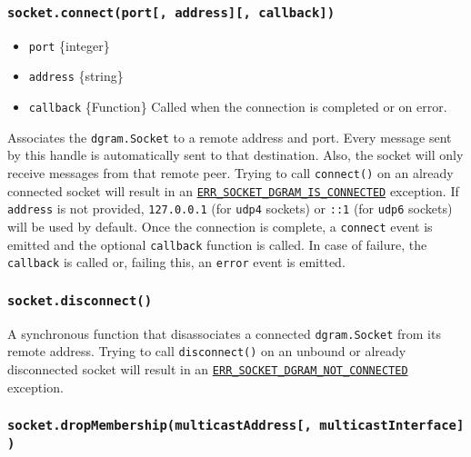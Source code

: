 \subsubsection{\texorpdfstring{\texttt{socket.connect(port{[},\ address{]}{[},\ callback{]})}}{socket.connect(port{[}, address{]}{[}, callback{]})}}\label{socket.connectport-address-callback}

\begin{itemize}
\tightlist
\item
  \texttt{port} \{integer\}
\item
  \texttt{address} \{string\}
\item
  \texttt{callback} \{Function\} Called when the connection is completed
  or on error.
\end{itemize}

Associates the \texttt{dgram.Socket} to a remote address and port. Every
message sent by this handle is automatically sent to that destination.
Also, the socket will only receive messages from that remote peer.
Trying to call \texttt{connect()} on an already connected socket will
result in an
\href{errors.md\#err_socket_dgram_is_connected}{\texttt{ERR\_SOCKET\_DGRAM\_IS\_CONNECTED}}
exception. If \texttt{address} is not provided,
\texttt{\textquotesingle{}127.0.0.1\textquotesingle{}} (for
\texttt{udp4} sockets) or
\texttt{\textquotesingle{}::1\textquotesingle{}} (for \texttt{udp6}
sockets) will be used by default. Once the connection is complete, a
\texttt{\textquotesingle{}connect\textquotesingle{}} event is emitted
and the optional \texttt{callback} function is called. In case of
failure, the \texttt{callback} is called or, failing this, an
\texttt{\textquotesingle{}error\textquotesingle{}} event is emitted.

\subsubsection{\texorpdfstring{\texttt{socket.disconnect()}}{socket.disconnect()}}\label{socket.disconnect}

A synchronous function that disassociates a connected
\texttt{dgram.Socket} from its remote address. Trying to call
\texttt{disconnect()} on an unbound or already disconnected socket will
result in an
\href{errors.md\#err_socket_dgram_not_connected}{\texttt{ERR\_SOCKET\_DGRAM\_NOT\_CONNECTED}}
exception.

\subsubsection{\texorpdfstring{\texttt{socket.dropMembership(multicastAddress{[},\ multicastInterface{]})}}{socket.dropMembership(multicastAddress{[}, multicastInterface{]})}}\label{socket.dropmembershipmulticastaddress-multicastinterface}

